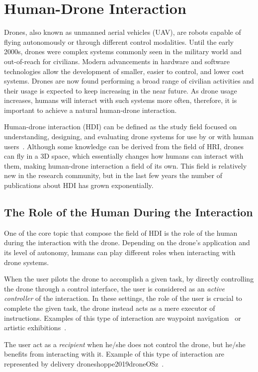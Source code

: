 \section{Human-Drone Interaction}\label{sec:soa_hdi}
Drones, also known as unmanned aerial vehicles (UAV), are robots capable of flying autonomously or through different control modalities.
Until the early 2000s, drones were complex systems commonly seen in the military world and out-of-reach for civilians. 
Modern advancements in hardware and software technologies allow the development of smaller, easier to control, and lower cost systems.
Drones are now found performing a broad range of civilian activities and their usage is expected to keep increasing in the near future.
As drone usage increases, humans will interact with such systems more often, therefore, it is important to achieve a natural human-drone interaction.

Human-drone interaction (HDI) can be defined as the study field focused on understanding, designing, and evaluating drone systems 
for use by or with human users~\cite{tezza2019hdi}. Although some knowledge can be derived from the field of HRI, 
drones can fly in a 3D space, which essentially changes how humans can interact with them, making human-drone interaction a field of its own.
This field is relatively new in the research community, but in the last few years the number of publications about HDI has grown exponentially.

\subsection{The Role of the Human During the Interaction}\label{subsec:hdi_interacction_role}
One of the core topic that compose the field of HDI is the role of the human during the interaction with the drone.
Depending on the drone's application and its level of autonomy, humans can play different roles when interacting with drone systems.

When the user pilots the drone to accomplish a given task, by directly controlling the drone through a control interface, 
the user is considered as an \textit{active controller} of the interaction. In these settings, the role of the user is crucial to complete the
given task, the drone instead acts as a mere executor of instructions. 
Examples of this type of interaction are waypoint navigation~\cite{hoppe2019droneOS} or artistic exhibitions~\cite{eriksson2020ethicsInMovement}.

The user act as a \textit{recipient} when he/she does not control the drone, but he/she benefits from interacting with it. Example of this type 
of interaction are represented by delivery droneshoppe2019droneOSz~\cite{singireddy2018primeAir, wingDrones}.

